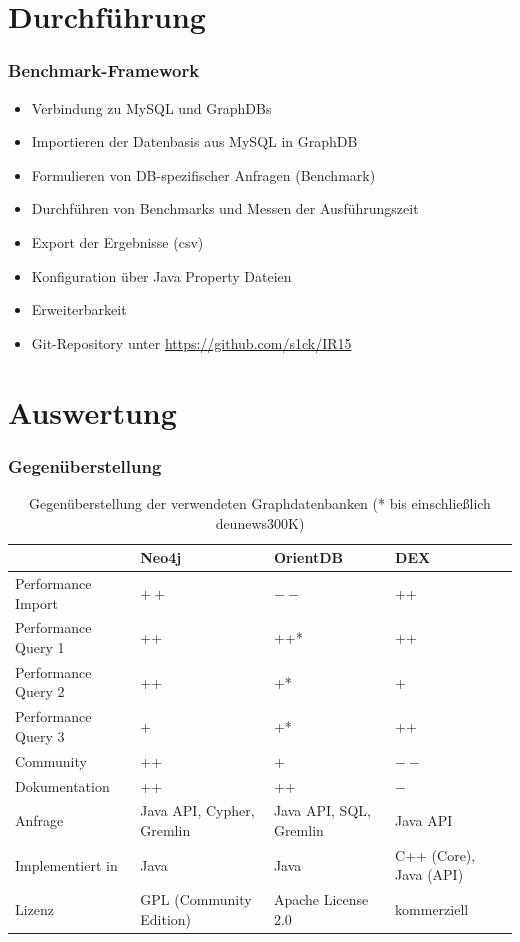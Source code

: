 \documentclass{beamer}
\begin{document}
\section{Durchführung}
\begin{frame}\frametitle{Benchmark-Framework} 
	\begin{itemize}
		\item Verbindung zu MySQL und GraphDBs
		\item Importieren der Datenbasis aus MySQL in GraphDB
		\item Formulieren von DB-spezifischer Anfragen (Benchmark)
		\item Durchführen von Benchmarks und Messen der Ausführungszeit
		\item Export der Ergebnisse (csv)
		\item Konfiguration über Java Property Dateien
		\item Erweiterbarkeit
		\item Git-Repository unter \href{https://github.com/s1ck/IR15}{https://github.com/s1ck/IR15}

	\end{itemize} 
\end{frame}

\section{Auswertung}
\begin{frame}\frametitle{Gegenüberstellung}

	\renewcommand{\arraystretch}{1.5}
	
	\begin{table}[ht]
	\begin{tabular}{|l||p{2.5cm}|p{2.5cm}|p{2.5cm}|}
	\hline 
	 & \textbf{Neo4j} & \textbf{OrientDB} & \textbf{DEX} \\ 
	\hline
	Performance Import & $++$ & $--$ & ++ \\ 
	\hline 
	Performance Query 1 & ++ & ++* & ++ \\ 
	\hline 
	Performance Query 2 & ++ & +* & + \\ 
	\hline 
	Performance Query 3 & + & +* & ++ \\ 
	\hline
	Community & ++ & + & $--$ \\ 
	\hline 
	Dokumentation & ++ & ++ & $-$ \\
	\hline 
	Anfrage & Java API, Cypher, Gremlin & Java API, SQL, Gremlin & Java API \\
	\hline
	Implementiert in & Java & Java & C++ (Core), Java (API) \\
	\hline 
	Lizenz & GPL (Community Edition) & Apache License 2.0 & kommerziell	 \\ 
	\hline 
	\end{tabular}
	\caption{Gegenüberstellung der verwendeten Graphdatenbanken (* bis einschließlich deu\textunderscore news\textunderscore 300K)}
	\label{tab:compare}
	\end{table}
\normalfont
\end{frame}
\end{document}
